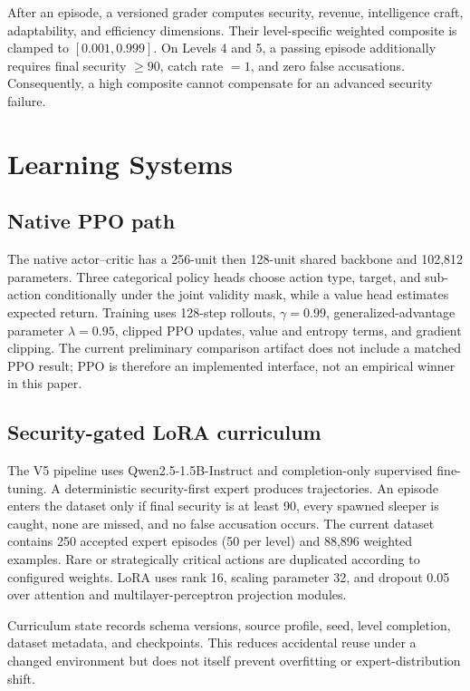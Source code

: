 \documentclass[11pt]{article}
\begin{document}
After an episode, a versioned grader computes security, revenue, intelligence craft, adaptability, and efficiency dimensions. Their level-specific weighted composite is clamped to $[0.001,0.999]$. On Levels 4 and 5, a passing episode additionally requires final security $\geq 90$, catch rate $=1$, and zero false accusations. Consequently, a high composite cannot compensate for an advanced security failure.

\section{Learning Systems}

\subsection{Native PPO path}

The native actor--critic has a 256-unit then 128-unit shared backbone and 102,812 parameters. Three categorical policy heads choose action type, target, and sub-action conditionally under the joint validity mask, while a value head estimates expected return. Training uses 128-step rollouts, $\gamma=0.99$, generalized-advantage parameter $\lambda=0.95$, clipped PPO updates, value and entropy terms, and gradient clipping. The current preliminary comparison artifact does not include a matched PPO result; PPO is therefore an implemented interface, not an empirical winner in this paper.

\subsection{Security-gated LoRA curriculum}

The V5 pipeline uses Qwen2.5-1.5B-Instruct and completion-only supervised fine-tuning. A deterministic security-first expert produces trajectories. An episode enters the dataset only if final security is at least 90, every spawned sleeper is caught, none are missed, and no false accusation occurs. The current dataset contains 250 accepted expert episodes (50 per level) and 88,896 weighted examples. Rare or strategically critical actions are duplicated according to configured weights. LoRA uses rank 16, scaling parameter 32, and dropout 0.05 over attention and multilayer-perceptron projection modules.

Curriculum state records schema versions, source profile, seed, level completion, dataset metadata, and checkpoints. This reduces accidental reuse under a changed environment but does not itself prevent overfitting or expert-distribution shift.
\end{document}
